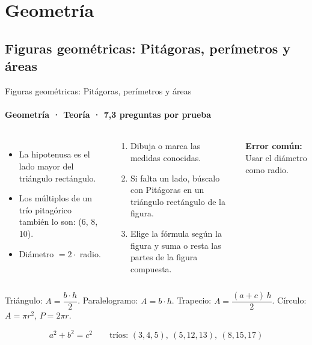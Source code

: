 \documentclass[aspectratio=169,11pt]{beamer}
\newlength{\ajustealto}
\newenvironment{ajustar}[1][0.74\textheight]
  {\setlength{\ajustealto}{#1}\begin{lrbox}{\ajustecaja}\begin{minipage}{\textwidth}}
  {\end{minipage}\end{lrbox}%
   \ifdim\dimexpr\ht\ajustecaja+\dp\ajustecaja\relax>\ajustealto
     \resizebox*{!}{\ajustealto}{\usebox{\ajustecaja}}\else\usebox{\ajustecaja}\fi}
\begin{document}
\section{Geometría}

\subsection{Figuras geométricas: Pitágoras, perímetros y áreas}

\begin{frame}{Figuras geométricas: Pitágoras, perímetros y áreas}
\label{tema-m1-areas}
\framesubtitle{Geometría · Teoría · 7,3 preguntas por prueba}
\begin{ajustar}
\begin{columns}[T,onlytextwidth]
\begin{itemize}\footnotesize
\item La hipotenusa es el lado mayor del triángulo rectángulo.
\item Los múltiplos de un trío pitagórico también lo son: (6, 8, 10).
\item Diámetro $=2\cdot$ radio.
\end{itemize}
\begin{cajaregla}\scriptsize \begin{enumerate}\item Dibuja o marca las medidas conocidas.\item Si falta un lado, búscalo con Pitágoras en un triángulo rectángulo de la figura.\item Elige la fórmula según la figura y suma o resta las partes de la figura compuesta.\end{enumerate}\end{cajaregla}
\begin{notagris}\scriptsize \textbf{Error común:} Usar el diámetro como radio.\end{notagris}
\end{columns}
\begin{cajaclave}[Fórmulas]\footnotesize
Triángulo: $A=\dfrac{b\cdot h}{2}$. Paralelogramo: $A=b\cdot h$. Trapecio: $A=\dfrac{(a+c)\,h}{2}$. Círculo: $A=\pi r^2$, $P=2\pi r$.

\[a^2+b^2=c^2 \quad\quad \text{tríos: } (3,4,5),\ (5,12,13),\ (8,15,17)\]
\end{cajaclave}
\end{ajustar}
\end{frame}
\end{document}
